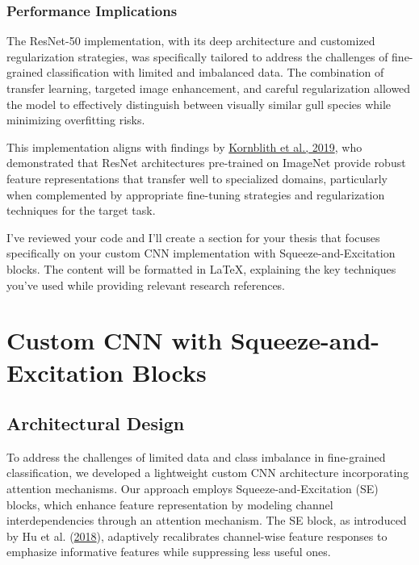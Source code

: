 \documentclass[a4paper,12pt]{article}
\begin{document}
\subsubsection{Performance Implications}

The ResNet-50 implementation, with its deep architecture and customized regularization strategies, was specifically tailored to address the challenges of fine-grained classification with limited and imbalanced data. The combination of transfer learning, targeted image enhancement, and careful regularization allowed the model to effectively distinguish between visually similar gull species while minimizing overfitting risks.

This implementation aligns with findings by {\href{https://arxiv.org/abs/1901.09076}{Kornblith et al., 2019}}, who demonstrated that ResNet architectures pre-trained on ImageNet provide robust feature representations that transfer well to specialized domains, particularly when complemented by appropriate fine-tuning strategies and regularization techniques for the target task.

I've reviewed your code and I'll create a section for your thesis that focuses specifically on your custom CNN implementation with Squeeze-and-Excitation blocks. The content will be formatted in LaTeX, explaining the key techniques you've used while providing relevant research references.

\section{Custom CNN with Squeeze-and-Excitation Blocks}

\subsection{Architectural Design}

To address the challenges of limited data and class imbalance in fine-grained classification, we developed a lightweight custom CNN architecture incorporating attention mechanisms. Our approach employs Squeeze-and-Excitation (SE) blocks, which enhance feature representation by modeling channel interdependencies through an attention mechanism. The SE block, as introduced by Hu et al. (\href{https://openaccess.thecvf.com/content_cvpr_2018/papers/Hu_Squeeze-and-Excitation_Networks_CVPR_2018_paper.pdf}{2018}), adaptively recalibrates channel-wise feature responses to emphasize informative features while suppressing less useful ones.
\end{document}
